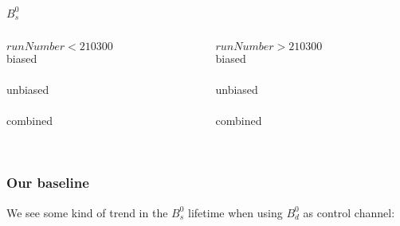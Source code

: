 \begin{frame}{$B_s^0$}
  
  \begin{columns}
  
    \begin{column}{0.45\textwidth}
    $runNumber<210300$\\[3mm]
    {biased} \\[2mm]
    \resizebox{\textwidth}{!}{}\\[5mm]
    {unbiased} \\[2mm]
    \resizebox{\textwidth}{!}{}\\[5mm]
    {combined} \\[2mm]
    \resizebox{\textwidth}{!}{}\\
    \end{column}
  
    \begin{column}{0.45\textwidth}
    $runNumber>210300$\\[3mm]
    {biased} \\[2mm]
    \resizebox{\textwidth}{!}{}\\[5mm]
    {unbiased} \\[2mm]
    \resizebox{\textwidth}{!}{}\\[5mm]
    {combined} \\[2mm]
    \resizebox{\textwidth}{!}{}\\
    \end{column}
  
  \end{columns}

\end{frame}


\begin{frame}
\frametitle{Our baseline}
\footnotesize

We see some kind of trend in the $B_s^0$ lifetime when using $B_d^0$ as control
channel:

\medskip



\end{frame}



